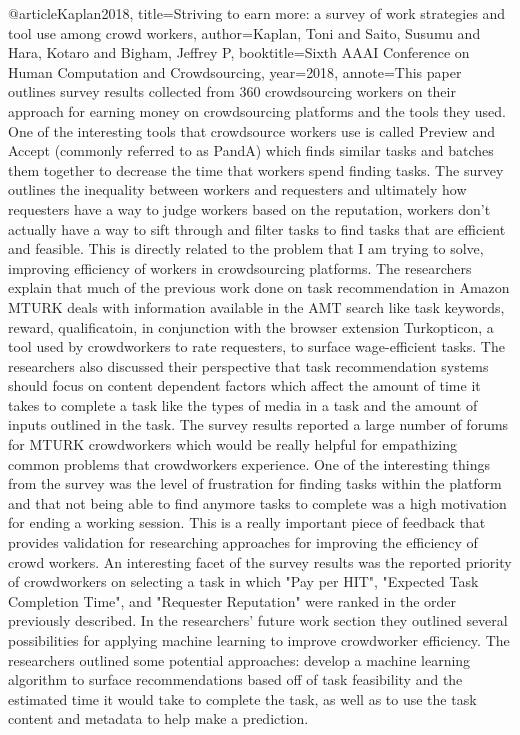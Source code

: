 @article{Kaplan2018,
  title={Striving to earn more: a survey of work strategies and tool use among crowd workers},
  author={Kaplan, Toni and Saito, Susumu and Hara, Kotaro and Bigham, Jeffrey P},
  booktitle={Sixth AAAI Conference on Human Computation and Crowdsourcing},
  year={2018},
  annote={This paper outlines survey results collected from 360 crowdsourcing workers on their approach for earning money on crowdsourcing platforms and the tools they used. One of the interesting tools that crowdsource workers use is called Preview and Accept (commonly referred to as PandA) which finds similar
  tasks and batches them together to decrease the time that workers spend finding tasks. The survey outlines the inequality between workers and requesters and ultimately how requesters have a way to judge workers based on the reputation, workers don't actually have a way to sift through and filter tasks to find tasks that are efficient and feasible. This is
  directly related to the problem that I am trying to solve, improving efficiency of workers in crowdsourcing platforms. The researchers explain that much of the previous work done on task recommendation in Amazon MTURK deals with information available in the AMT search like task keywords, reward, qualificatoin, in conjunction with the
  browser extension Turkopticon, a tool used by crowdworkers to rate requesters, to surface wage-efficient tasks. The researchers also discussed their perspective that task recommendation systems should focus on content dependent factors which affect the amount of time it takes to complete a task like the types of media in a task and the 
  amount of inputs outlined in the task. The survey results reported a large number of forums for MTURK crowdworkers which would be really helpful for empathizing common problems that crowdworkers experience. One of the interesting things from the survey was the level of frustration for finding tasks within the platform and that not being
  able to find anymore tasks to complete was a high motivation for ending a working session. This is a really important piece of feedback that provides validation for researching approaches for improving the efficiency of crowd workers. An interesting facet of the survey results was the reported priority of crowdworkers on selecting a task in which "Pay per HIT", "Expected Task Completion Time",
  and "Requester Reputation" were ranked in the order previously described. In the researchers' future work section they outlined several possibilities for applying machine learning to improve crowdworker efficiency. The researchers outlined some potential approaches: develop a machine learning algorithm to surface recommendations based off of task feasibility and the
  estimated time it would take to complete the task, as well as to use the task content and metadata to help make a prediction. }
}

